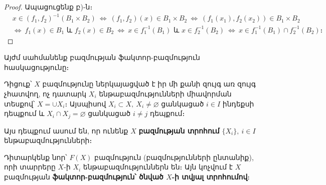 \documentclass[./main.tex]{subfiles}
\begin{document}
\begin{proof}
Ապացուցենք բ)-ն։
\begin{align*}
& x\in (f_1,f_2)^{-1}(B_1\times B_2)\ \Leftrightarrow \ (f_1,f_2)(x) \in B_1\times B_2 \ \Leftrightarrow \ (f_1(x_1),f_2(x_2)) \in B_1\times B_2 \\
& \Leftrightarrow \ f_1(x)\in B_1 \textrm{ և } f_2(x)\in B_2\ \Leftrightarrow \ x \in f_1^{-1}(B_1) \textrm{ և } x \in f_2^{-1}(B_2) \ \Leftrightarrow\ x \in f_1^{-1}(B_1) \cap f_2^{-1}(B_2)։
\end{align*}
\end{proof}
\par Այժմ սահմանենք բազմության ֆակտոր-բազ\-մու\-թյուն հասկացությունը։
\par Դիցուք՝ $X$ բազմությունը ներկայացված է իր մի քանի զույգ առ զույգ չհատվող, ոչ դատարկ $X_i$ ենթաբազմությունների միավորման տեսքով՝ $X=\cup X_i$։ Այսպիսով ${X_i \subset X},\ X_i\neq \varnothing$ ցանկացած $i\in I$ ինդեքսի դեպքում և $X_i\cap X_j=\varnothing$ ցանկացած $i\neq j$ դեպքում։
\par Այս դեպքում ասում են, որ ունենք $X$ \textbf{բազմության տրոհում} $\{X_i\},\ i\in I$ ենթա\-բազ\-մու\-թյունների։
\par Դիտարկենք նոր՝ $F(X)$ բազմություն (բազմությունների ընտանիք), որի տար\-րե\-րը $X$-ի $X_i$ ենթաբազմու\-թյուն\-ներն են։ Այն կոչվում է $X$ բազմության \textbf{ֆակտոր-բազմու\-թյուն՝ ծնված $X$-ի տվյալ տրոհումով}։
\end{document}
